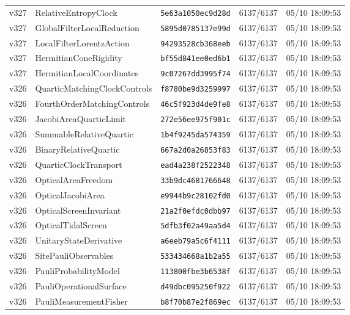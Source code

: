 \documentclass[11pt]{article}
\theoremstyle{definition}\newtheorem{deriv}{Derivação}
\begin{document}
{\begin{longtable}{@{}lllll@{}}
v327 & RelativeEntropyClock & \texttt{5e63a1050ec9d28d} & 6137/6137 & 05/10 18:09:53 \\
v327 & GlobalFilterLocalReduction & \texttt{5895d0785137e99d} & 6137/6137 & 05/10 18:09:53 \\
v327 & LocalFilterLorentzAction & \texttt{94293528cb368eeb} & 6137/6137 & 05/10 18:09:53 \\
v327 & HermitianConeRigidity & \texttt{bf55d841ee0ed6b1} & 6137/6137 & 05/10 18:09:53 \\
v327 & HermitianLocalCoordinates & \texttt{9c07267dd3995f74} & 6137/6137 & 05/10 18:09:53 \\
v326 & QuarticMatchingClockControls & \texttt{f8780be9d3259997} & 6137/6137 & 05/10 18:09:53 \\
v326 & FourthOrderMatchingControls & \texttt{46c5f923d4de9fe8} & 6137/6137 & 05/10 18:09:53 \\
v326 & JacobiAreaQuarticLimit & \texttt{272e56ee975f901c} & 6137/6137 & 05/10 18:09:53 \\
v326 & SummableRelativeQuartic & \texttt{1b4f9245da574359} & 6137/6137 & 05/10 18:09:53 \\
v326 & BinaryRelativeQuartic & \texttt{667a2d0a26853f83} & 6137/6137 & 05/10 18:09:53 \\
v326 & QuarticClockTransport & \texttt{ead4a238f2522348} & 6137/6137 & 05/10 18:09:53 \\
v326 & OpticalAreaFreedom & \texttt{33b9dc4681766648} & 6137/6137 & 05/10 18:09:53 \\
v326 & OpticalJacobiArea & \texttt{e9944b9c28102fd0} & 6137/6137 & 05/10 18:09:53 \\
v326 & OpticalScreenInvariant & \texttt{21a2f0efdc0dbb97} & 6137/6137 & 05/10 18:09:53 \\
v326 & OpticalTidalScreen & \texttt{5dfb3f02a49aa5d4} & 6137/6137 & 05/10 18:09:53 \\
v326 & UnitaryStateDerivative & \texttt{a6eeb79a5c6f4111} & 6137/6137 & 05/10 18:09:53 \\
v326 & SitePauliObservables & \texttt{533434668a1b2a55} & 6137/6137 & 05/10 18:09:53 \\
v326 & PauliProbabilityModel & \texttt{113800fbe3b6538f} & 6137/6137 & 05/10 18:09:53 \\
v326 & PauliOperationalSurface & \texttt{d49dbc095250f922} & 6137/6137 & 05/10 18:09:53 \\
v326 & PauliMeasurementFisher & \texttt{b8f70b87e2f869ec} & 6137/6137 & 05/10 18:09:53 \\

\end{longtable}}
\end{document}
